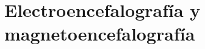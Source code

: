 \documentclass[11pt,spanish,listoffigures,listoftables]{tfgetsinf}
\begin{document}



\section{Electroencefalografía y magnetoencefalografía}

\end{document}
